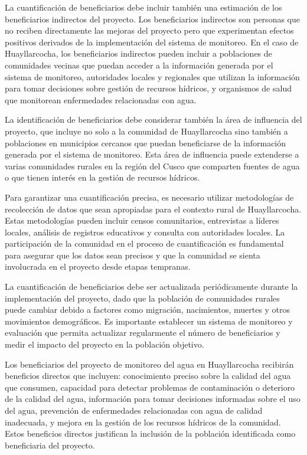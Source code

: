 La cuantificación de beneficiarios debe incluir también una estimación de los beneficiarios indirectos del proyecto. Los beneficiarios indirectos son personas que no reciben directamente las mejoras del proyecto pero que experimentan efectos positivos derivados de la implementación del sistema de monitoreo. En el caso de Huayllarcocha, los beneficiarios indirectos pueden incluir a poblaciones de comunidades vecinas que puedan acceder a la información generada por el sistema de monitoreo, autoridades locales y regionales que utilizan la información para tomar decisiones sobre gestión de recursos hídricos, y organismos de salud que monitorean enfermedades relacionadas con agua.

La identificación de beneficiarios debe considerar también la área de influencia del proyecto, que incluye no solo a la comunidad de Huayllarcocha sino también a poblaciones en municipios cercanos que puedan beneficiarse de la información generada por el sistema de monitoreo. Esta área de influencia puede extenderse a varias comunidades rurales en la región del Cusco que comparten fuentes de agua o que tienen interés en la gestión de recursos hídricos.

Para garantizar una cuantificación precisa, es necesario utilizar metodologías de recolección de datos que sean apropiadas para el contexto rural de Huayllarcocha. Estas metodologías pueden incluir censos comunitarios, entrevistas a líderes locales, análisis de registros educativos y consulta con autoridades locales. La participación de la comunidad en el proceso de cuantificación es fundamental para asegurar que los datos sean precisos y que la comunidad se sienta involucrada en el proyecto desde etapas tempranas.

La cuantificación de beneficiarios debe ser actualizada periódicamente durante la implementación del proyecto, dado que la población de comunidades rurales puede cambiar debido a factores como migración, nacimientos, muertes y otros movimientos demográficos. Es importante establecer un sistema de monitoreo y evaluación que permita actualizar regularmente el número de beneficiarios y medir el impacto del proyecto en la población objetivo.

Los beneficiarios del proyecto de monitoreo del agua en Huayllarcocha recibirán beneficios directos que incluyen: conocimiento preciso sobre la calidad del agua que consumen, capacidad para detectar problemas de contaminación o deterioro de la calidad del agua, información para tomar decisiones informadas sobre el uso del agua, prevención de enfermedades relacionadas con agua de calidad inadecuada, y mejora en la gestión de los recursos hídricos de la comunidad. Estos beneficios directos justifican la inclusión de la población identificada como beneficiaria del proyecto.

